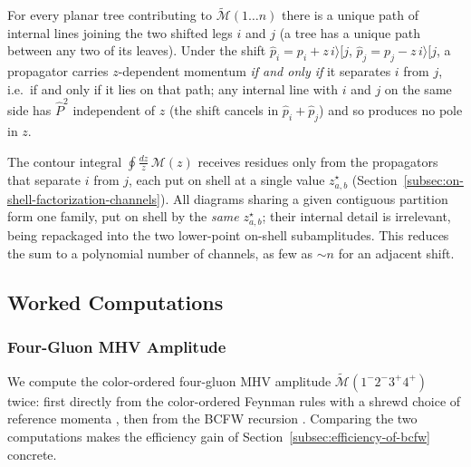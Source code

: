 For every planar tree contributing to $\widetilde{\mathcal{M}}(1 \ldots n)$ there is a unique path of internal lines joining the two shifted legs $i$ and $j$ (a tree has a unique path between any two of its leaves). Under the shift $\hat p_i = p_i + z\, i\rangle[j$, $\hat p_j = p_j - z\, i\rangle[j$, a propagator carries $z$-dependent momentum \emph{if and only if} it separates $i$ from $j$, i.e.\ if and only if it lies on that path; any internal line with $i$ and $j$ on the same side has $\hat P^2$ independent of $z$ (the shift cancels in $\hat p_i + \hat p_j$) and so produces no pole in $z$.

The contour integral $\oint \frac{dz}{z}\,\mathcal{M}(z)$ receives residues only from the propagators that separate $i$ from $j$, each put on shell at a single value $z^{\star}_{a,b}$ (Section~\ref{subsec:on-shell-factorization-channels}). All diagrams sharing a given contiguous partition form one family, put on shell by the \emph{same} $z^{\star}_{a,b}$; their internal detail is irrelevant, being repackaged into the two lower-point on-shell subamplitudes. This reduces the sum to a polynomial number of channels, as few as $\sim n$ for an adjacent shift.

\subsection{Worked Computations}
\label{subsec:worked-computations}

\subsubsection{Four-Gluon MHV Amplitude}
\label{subsubsec:four-gluon-mhv-amplitude}

We compute the color-ordered four-gluon MHV amplitude $\widetilde{\mathcal{M}}(1^- 2^- 3^+ 4^+)$ twice: first directly from the color-ordered Feynman rules with a shrewd choice of reference momenta \autocite[\S27.3]{schwartzQFT2014}, then from the BCFW recursion \autocite[\S27.5]{schwartzQFT2014}. Comparing the two computations makes the efficiency gain of Section~\ref{subsec:efficiency-of-bcfw} concrete.

